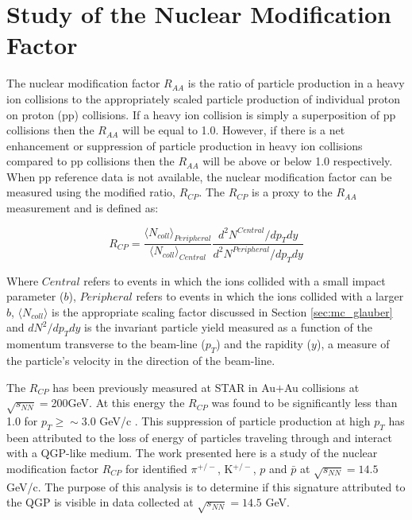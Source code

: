 \section{Study of the Nuclear Modification Factor}
The nuclear modification factor $R_{AA}$ is the ratio of particle production in a heavy ion collisions to the appropriately scaled particle production of individual proton on proton (pp) collisions. If a heavy ion collision is simply a superposition of pp collisions then the $R_{AA}$ will be equal to 1.0. However, if there is a net enhancement or suppression of particle production in heavy ion collisions compared to pp collisions then the $R_{AA}$ will be above or below 1.0 respectively. When pp reference data is not available, the nuclear modification factor can be measured using the modified ratio, $R_{CP}$. The $R_{CP}$ is a proxy to the $R_{AA}$ measurement and is defined as:

\begin{equation}
	R_{CP} = \frac{ \langle N_{coll} \rangle_{Peripheral} } {  \langle N_{coll} \rangle_{Central} } \frac{ d^2 N^{Central} / dp_{T}dy } { d^2 N^{Peripheral} / dp_{T}dy }
	\label{eq:r_cp}
\end{equation}

Where $Central$ refers to events in which the ions collided with a small impact parameter ($b$), $Peripheral$ refers to events in which the ions collided with a larger $b$, $\langle N_{coll} \rangle $ is the appropriate scaling factor discussed in Section \ref{sec:mc_glauber} and $dN^2/dp_T dy$ is the invariant particle yield measured as a function of the momentum transverse to the beam-line ($p_T$) and the rapidity ($y$), a measure of the particle's velocity in the direction of the beam-line. 

The $R_{CP}$ has been previously measured at STAR in Au$+$Au collisions at $\sqrt{s_{NN}}=$200GeV. At this energy the $R_{CP}$ was found to be significantly less than 1.0 for $p_T \geq \sim$3.0 GeV/c \cite{}. This suppression of particle production at high $p_T$ has been attributed to the loss of energy of particles traveling through and interact with a QGP-like medium. The work presented here is a study of the nuclear modification factor $R_{CP}$ for identified $\pi^{+/-}$, K$^{+/-}$, $p$ and $\bar{p}$ at $\sqrt{s_{NN}}=14.5$ GeV/c. The purpose of this analysis is to determine if this signature attributed to the QGP is visible in data collected at $\sqrt{s_{NN}}=14.5$ GeV.





